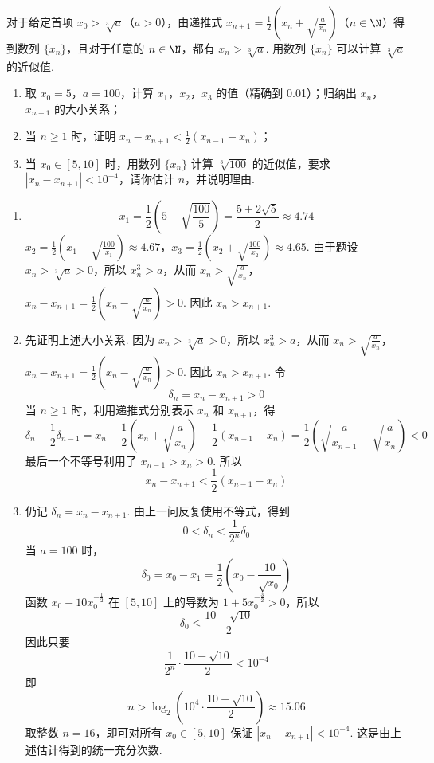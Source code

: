 \begin{problem}
对于给定首项 \(x_0 > \sqrt[3]{a}\)（\(a > 0\)），由递推式 \(x_{n+1} = \frac{1}{2}\left(x_n + \sqrt{\frac{a}{x_n}}\right)\)（\(n \in \N\)）得到数列 \(\{x_n\}\)，且对于任意的 \(n \in \N\)，都有 \(x_n > \sqrt[3]{a}\). 用数列 \(\{x_n\}\) 可以计算 \(\sqrt[3]{a}\) 的近似值.
\begin{enumerate}
\item 取 \(x_0 = 5\)，\(a = 100\)，计算 \(x_1\)，\(x_2\)，\(x_3\) 的值（精确到 0.01）；归纳出 \(x_n\)，\(x_{n+1}\) 的大小关系；
\item 当 \(n \geqslant 1\) 时，证明 \(x_n - x_{n+1} < \frac{1}{2}(x_{n-1} - x_n)\)；
\item 当 \(x_0 \in [5, 10]\) 时，用数列 \(\{x_n\}\) 计算 \(\sqrt[3]{100}\) 的近似值，要求 \(|x_n - x_{n+1}| < 10^{-4}\)，请你估计 \(n\)，并说明理由.
\end{enumerate}
\end{problem}

\begin{solution}
\begin{enumerate}
\item
\[
x_1=\frac12\left(5+\sqrt{\frac{100}{5}}\right)=\frac{5+2\sqrt5}{2}\approx4.74
\]
\(x_2=\frac12\left(x_1+\sqrt{\frac{100}{x_1}}\right)\approx4.67\)，\(x_3=\frac12\left(x_2+\sqrt{\frac{100}{x_2}}\right)\approx4.65\).
由于题设 \(x_n>\sqrt[3]{a}>0\)，所以 \(x_n^3>a\)，从而
\(x_n>\sqrt{\frac{a}{x_n}}\)，\(x_n-x_{n+1}=\frac12\left(x_n-\sqrt{\frac{a}{x_n}}\right)>0\).
因此 \(x_n>x_{n+1}\).

\item
先证明上述大小关系. 因为 \(x_n>\sqrt[3]{a}>0\)，所以 \(x_n^3>a\)，从而
\(x_n>\sqrt{\frac{a}{x_n}}\)，\(x_n-x_{n+1}=\frac12\left(x_n-\sqrt{\frac{a}{x_n}}\right)>0\).
因此 \(x_n>x_{n+1}\). 令
\[
\delta_n=x_n-x_{n+1}>0
\]
当 \(n\ge1\) 时，利用递推式分别表示 \(x_n\) 和 \(x_{n+1}\)，得
\[
\delta_n-\frac12\delta_{n-1}
=x_n-\frac12\left(x_n+\sqrt{\frac{a}{x_n}}\right)-\frac12(x_{n-1}-x_n)
=\frac12\left(\sqrt{\frac{a}{x_{n-1}}}-\sqrt{\frac{a}{x_n}}\right)<0
\]
最后一个不等号利用了 \(x_{n-1}>x_n>0\). 所以
\[
x_n-x_{n+1}<\frac12(x_{n-1}-x_n)
\]

\item 仍记 \(\delta_n=x_n-x_{n+1}\). 由上一问反复使用不等式，得到
\[
0<\delta_n<\frac{1}{2^n}\delta_0
\]
当 \(a=100\) 时，
\[
\delta_0=x_0-x_1
 =\frac12\left(x_0-\frac{10}{\sqrt{x_0}}\right)
\]
函数 \(x_0-10x_0^{-\frac{1}{2}}\) 在 \([5,10]\) 上的导数为 \(1+5x_0^{-\frac{3}{2}}>0\)，所以
\[
\delta_0\le\frac{10-\sqrt{10}}{2}
\]
因此只要
\[
\frac{1}{2^n}\cdot\frac{10-\sqrt{10}}{2}<10^{-4}
\]
即
\[
n>\log_2\left(10^4\cdot\frac{10-\sqrt{10}}{2}\right)\approx15.06
\]
取整数 \(n=16\)，即可对所有 \(x_0\in[5,10]\) 保证 \(|x_n-x_{n+1}|<10^{-4}\). 这是由上述估计得到的统一充分次数.
\end{enumerate}
\end{solution}
